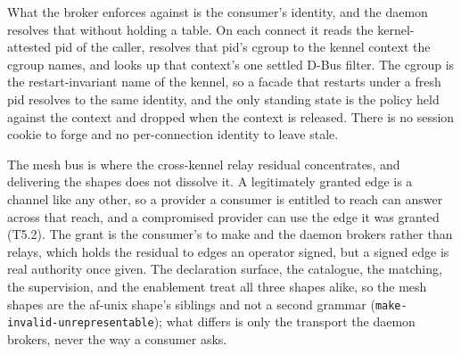 What the broker enforces against is the consumer's identity, and the
daemon resolves that without holding a table. On each connect it reads
the kernel-attested pid of the caller, resolves that pid's cgroup to the
kennel context the cgroup names, and looks up that context's one settled
D-Bus filter. The cgroup is the restart-invariant name of the kennel, so
a facade that restarts under a fresh pid resolves to the same identity,
and the only standing state is the policy held against the context and
dropped when the context is released. There is no session cookie to
forge and no per-connection identity to leave stale.

The mesh bus is where the cross-kennel relay residual concentrates, and
delivering the shapes does not dissolve it. A legitimately granted edge
is a channel like any other, so a provider a consumer is entitled to
reach can answer across that reach, and a compromised provider can use
the edge it was granted (T5.2). The grant is the consumer's to make and
the daemon brokers rather than relays, which holds the residual to edges
an operator signed, but a signed edge is real authority once given. The
declaration surface, the catalogue, the matching, the supervision, and
the enablement treat all three shapes alike, so the mesh shapes are the
af-unix shape's siblings and not a second grammar
(\texttt{make-invalid-unrepresentable}); what differs is only the
transport the daemon brokers, never the way a consumer asks.
